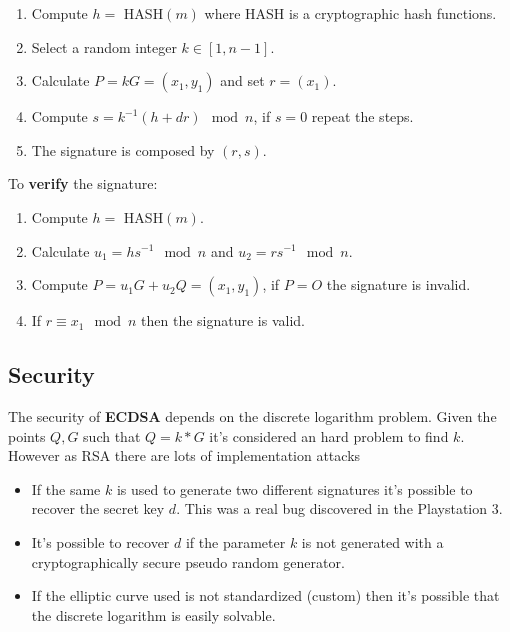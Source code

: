 \documentclass[a4paper,12pt]{report}
\begin{document}
\begin{enumerate}
    \item Compute $h = $ HASH$(m)$ where HASH is a cryptographic hash functions.
    \item Select a random integer $k \in [1, n-1]$.
    \item Calculate $P = kG = (x_1, y_1)$ and set $r = (x_1)$.
    \item Compute $s = k^{-1}(h + dr) \mod n$, if $s = 0$ repeat the steps.
    \item The signature is composed by $(r, s)$.
\end{enumerate}

\vspace*{10px}

To \textbf{verify} the signature:

\begin{enumerate}
    \item Compute $h = $ HASH$(m)$.
    \item Calculate $u_1 = hs^{-1} \mod n$ and $u_2 = rs^{-1} \mod n$.
    \item Compute $P = u_1G + u_2Q = (x_1, y_1)$, if $P = O$ the signature is invalid.
    \item If $r \equiv x_1 \mod n$ then the signature is valid.
\end{enumerate}

\subsection{Security}

The security of \textbf{ECDSA} depends on the discrete logarithm problem.
Given the points $Q, G$ such that $Q = k*G$ it's considered an hard problem to find $k$.
However as RSA there are lots of implementation attacks

\begin{itemize}
    \item If the same $k$ is used to generate two different signatures it's possible to recover the secret key $d$. This was a real bug 
        discovered in the Playstation 3.
    \item It's possible to recover $d$ if the parameter $k$ is not generated with a cryptographically secure pseudo random generator.
    \item If the elliptic curve used is not standardized (custom) then it's possible that the discrete logarithm is easily solvable.
\end{itemize}
\end{document}
